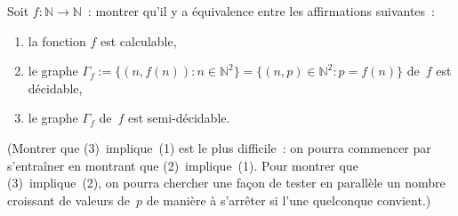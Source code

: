 \documentclass[12pt,a4paper]{article}
\theoremstyle{definition}
\begin{document}
Soit $f\colon \mathbb{N} \to \mathbb{N}$ : montrer qu'il y a
équivalence entre les affirmations suivantes :
\begin{enumerate}
\item la fonction $f$ est calculable,
\item le graphe $\Gamma_f := \{(n,f(n)) : n\in\mathbb{N}^2\} =
  \{(n,p)\in\mathbb{N}^2 : p=f(n)\}$ de $f$ est décidable,
\item le graphe $\Gamma_f$ de $f$ est semi-décidable.
\end{enumerate}

(Montrer que (3) implique (1) est le plus difficile : on pourra
commencer par s'entraîner en montrant que (2) implique (1).  Pour
montrer que (3) implique (2), on pourra chercher une façon de tester
en parallèle un nombre croissant de valeurs de $p$ de manière à
s'arrêter si l'une quelconque convient.)
\end{document}
